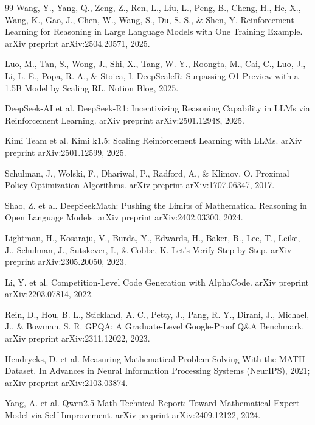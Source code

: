 \documentclass[12pt,a4paper]{ctexart}
\begin{document}
\begin{thebibliography}{99}
Wang, Y., Yang, Q., Zeng, Z., Ren, L., Liu, L., Peng, B., Cheng, H., He, X., Wang, K., Gao, J., Chen, W., Wang, S., Du, S. S., \& Shen, Y. Reinforcement Learning for Reasoning in Large Language Models with One Training Example. arXiv preprint arXiv:2504.20571, 2025.

Luo, M., Tan, S., Wong, J., Shi, X., Tang, W. Y., Roongta, M., Cai, C., Luo, J., Li, L. E., Popa, R. A., \& Stoica, I. DeepScaleR: Surpassing O1-Preview with a 1.5B Model by Scaling RL. Notion Blog, 2025.

DeepSeek-AI et al. DeepSeek-R1: Incentivizing Reasoning Capability in LLMs via Reinforcement Learning. arXiv preprint arXiv:2501.12948, 2025.

Kimi Team et al. Kimi k1.5: Scaling Reinforcement Learning with LLMs. arXiv preprint arXiv:2501.12599, 2025.

Schulman, J., Wolski, F., Dhariwal, P., Radford, A., \& Klimov, O. Proximal Policy Optimization Algorithms. arXiv preprint arXiv:1707.06347, 2017.

Shao, Z. et al. DeepSeekMath: Pushing the Limits of Mathematical Reasoning in Open Language Models. arXiv preprint arXiv:2402.03300, 2024.

Lightman, H., Kosaraju, V., Burda, Y., Edwards, H., Baker, B., Lee, T., Leike, J., Schulman, J., Sutskever, I., \& Cobbe, K. Let's Verify Step by Step. arXiv preprint arXiv:2305.20050, 2023.

Li, Y. et al. Competition-Level Code Generation with AlphaCode. arXiv preprint arXiv:2203.07814, 2022.

Rein, D., Hou, B. L., Stickland, A. C., Petty, J., Pang, R. Y., Dirani, J., Michael, J., \& Bowman, S. R. GPQA: A Graduate-Level Google-Proof Q\&A Benchmark. arXiv preprint arXiv:2311.12022, 2023.

Hendrycks, D. et al. Measuring Mathematical Problem Solving With the MATH Dataset. In Advances in Neural Information Processing Systems (NeurIPS), 2021; arXiv preprint arXiv:2103.03874.

Yang, A. et al. Qwen2.5-Math Technical Report: Toward Mathematical Expert Model via Self-Improvement. arXiv preprint arXiv:2409.12122, 2024.
\end{thebibliography}
\end{document}

